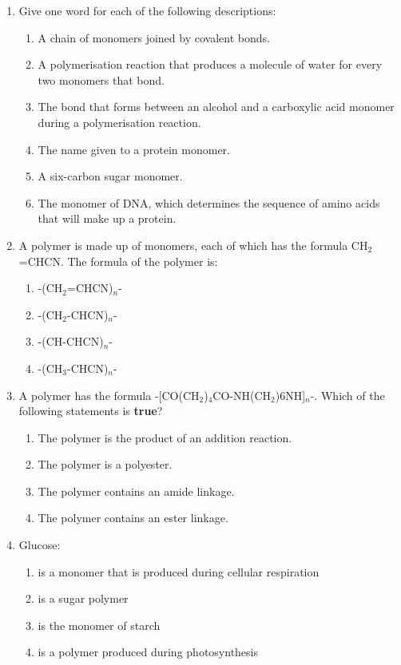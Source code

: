 \begin{eocexercises}{}
\begin{enumerate}

\item{Give one word for each of the following descriptions:}
	\begin{enumerate}
	\item{A chain of monomers joined by covalent bonds.}
	\item{A polymerisation reaction that produces a molecule of water for every two monomers that bond.}
	\item{The bond that forms between an alcohol and a carboxylic acid monomer during a polymerisation reaction.}
	\item{The name given to a protein monomer.}
	\item{A six-carbon sugar monomer.}
	\item{The monomer of DNA, which determines the sequence of amino acids that will make up a protein.}
	\end{enumerate}

	\item{A polymer is made up of monomers, each of which has the formula CH$_{2}$=CHCN. The formula of the polymer is:}
		\begin{enumerate}
		\item{-(CH$_{2}$=CHCN)$_{n}$-}	
		\item{-(CH$_{2}$-CHCN)$_{n}$-}
		\item{-(CH-CHCN)$_{n}$-}
		\item{-(CH$_{3}$-CHCN)$_{n}$-}
		\end{enumerate}

	\item{A polymer has the formula -[CO(CH$_{2}$)$_{4}$CO-NH(CH$_{2}$)6NH]$_{n}$-. Which of the following statements is \textbf{true}?}
		\begin{enumerate}
		\item{The polymer is the product of an addition reaction.}
		\item{The polymer is a polyester.}
		\item{The polymer contains an amide linkage.}
		\item{The polymer contains an ester linkage.}
		\end{enumerate}
	
	\item{Glucose:}
		\begin{enumerate}
		\item{is a monomer that is produced during cellular respiration}
		\item{is a sugar polymer}
		\item{is the monomer of starch}
		\item{is a polymer produced during photosynthesis}
		\end{enumerate}


\end{enumerate}
\end{eocexercises}
